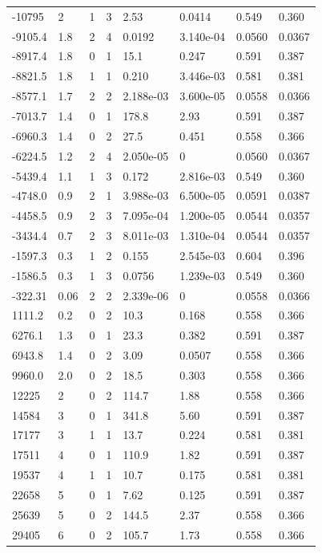 \documentclass[preview]{standalone}
\begin{document}
{{\begin{tabular}{L{1.2cm}C{1.2cm} C{0.3cm}C{0.5cm} C{1.4cm}C{1.4cm} C{1.4cm}C{1.4cm}}
  -10795  &     2  & 1     &  3 &  2.53  & 0.0414  & 0.549 &  0.360   \\ 
  -9105.4  &   1.8  & 2     &  4 &  0.0192  & 3.140e-04  & 0.0560 &  0.0367   \\ 
  -8917.4  &   1.8  & 0     &  1 &  15.1  & 0.247  & 0.591 &  0.387   \\ 
  -8821.5  &   1.8  & 1     &  1 &  0.210  & 3.446e-03  & 0.581 &  0.381   \\ 
  -8577.1  &   1.7  & 2     &  2 &  2.188e-03  & 3.600e-05  & 0.0558 &  0.0366   \\ 
  -7013.7  &   1.4  & 0     &  1 &  178.8  & 2.93  & 0.591 &  0.387   \\ 
  -6960.3  &   1.4  & 0     &  2 &  27.5  & 0.451  & 0.558 &  0.366   \\ 
  -6224.5  &   1.2  & 2     &  4 &  2.050e-05  & 0  & 0.0560 &  0.0367   \\ 
  -5439.4  &   1.1  & 1     &  3 &  0.172  & 2.816e-03  & 0.549 &  0.360   \\ 
  -4748.0  &   0.9  & 2     &  1 &  3.988e-03  & 6.500e-05  & 0.0591 &  0.0387   \\ 
  -4458.5  &   0.9  & 2     &  3 &  7.095e-04  & 1.200e-05  & 0.0544 &  0.0357   \\ 
  -3434.4  &   0.7  & 2     &  3 &  8.011e-03  & 1.310e-04  & 0.0544 &  0.0357   \\ 
  -1597.3  &   0.3  & 1     &  2 &  0.155  & 2.545e-03  & 0.604 &  0.396   \\ 
  -1586.5  &   0.3  & 1     &  3 &  0.0756  & 1.239e-03  & 0.549 &  0.360   \\ 
  -322.31  &  0.06  & 2     &  2 &  2.339e-06  & 0  & 0.0558 &  0.0366   \\ 
  1111.2  &   0.2  & 0     &  2 &  10.3  & 0.168  & 0.558 &  0.366   \\ 
  6276.1  &   1.3  & 0     &  1 &  23.3  & 0.382  & 0.591 &  0.387   \\ 
  6943.8  &   1.4  & 0     &  2 &  3.09  & 0.0507  & 0.558 &  0.366   \\ 
  9960.0  &   2.0  & 0     &  2 &  18.5  & 0.303  & 0.558 &  0.366   \\ 
  12225  &     2  & 0     &  2 &  114.7  & 1.88  & 0.558 &  0.366   \\ 
  14584  &     3  & 0     &  1 &  341.8  & 5.60  & 0.591 &  0.387   \\ 
  17177  &     3  & 1     &  1 &  13.7  & 0.224  & 0.581 &  0.381   \\ 
  17511  &     4  & 0     &  1 &  110.9  & 1.82  & 0.591 &  0.387   \\ 
  19537  &     4  & 1     &  1 &  10.7  & 0.175  & 0.581 &  0.381   \\ 
  22658  &     5  & 0     &  1 &  7.62  & 0.125  & 0.591 &  0.387   \\ 
  25639  &     5  & 0     &  2 &  144.5  & 2.37  & 0.558 &  0.366   \\ 
  29405  &     6  & 0     &  2 &  105.7  & 1.73  & 0.558 &  0.366   \\ 
\hline 
\end{tabular} 

}}
\end{document}
